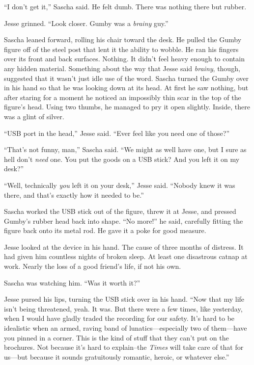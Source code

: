 \documentclass[12pt]{book}
\begin{document}
``I don't get it,'' Sascha said.  He felt dumb.  There was nothing there but rubber.

Jesse grinned.  ``Look closer.  Gumby was a \emph{brainy} guy.''

Sascha leaned forward, rolling his chair toward the desk.  He pulled the Gumby figure off of the steel post that lent it the ability to wobble.  He ran his fingers over its front and back surfaces.  Nothing.  It didn't feel heavy enough to contain any hidden material.  Something about the way that Jesse said \emph{brainy}, though, suggested that it wasn't just idle use of the word.  Sascha turned the Gumby over in his hand so that he was looking down at its head.  At first he saw nothing, but after staring for a moment he noticed an impossibly thin scar in the top of the figure's head.  Using two thumbs, he managed to pry it open slightly.  Inside, there was a glint of silver.

``USB port in the head,'' Jesse said.  ``Ever feel like you need one of those?''

``That's not funny, man,'' Sascha said.  ``We might as well have one, but I sure as hell don't \emph{need} one.  You put the goods on a USB stick?  And you left it on my desk?''

``Well, technically \emph{you} left it on your desk,'' Jesse said.  ``Nobody knew it was there, and that's exactly how it needed to be.''

Sascha worked the USB stick out of the figure, threw it at Jesse, and pressed Gumby's rubber head back into shape.  ``No more!'' he said, carefully fitting the figure back onto its metal rod.  He gave it a poke for good measure.

Jesse looked at the device in his hand.  The cause of three months of distress.  It had given him countless nights of broken sleep.  At least one disastrous catnap at work.  Nearly the loss of a good friend's life, if not his own.

Sascha was watching him.  ``Was it worth it?''

Jesse pursed his lips, turning the USB stick over in his hand.  ``Now that my life isn't being threatened, yeah.  It was.  But there were a few times, like yesterday, when I would have gladly traded the recording for our safety.  It's hard to be idealistic when an armed, raving band of lunatics---especially two of them---have you pinned in a corner.  This is the kind of stuff that they can't put on the brochures.  Not because it's hard to explain--the \emph{Times} will take care of that for us---but because it sounds gratuitously romantic, heroic, or whatever else.''
\end{document}
